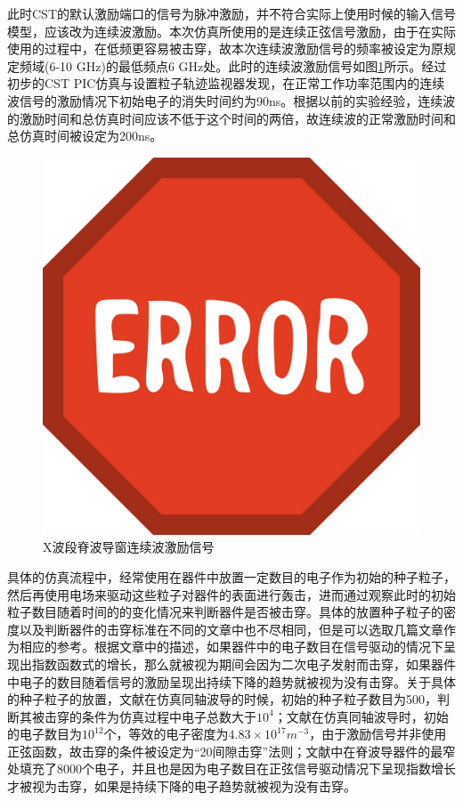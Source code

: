 \documentclass[master]{thesis-uestc}
\begin{document}
此时CST的默认激励端口的信号为脉冲激励，并不符合实际上使用时候的输入信号模型，应该改为连续波激励。本次仿真所使用的是连续正弦信号激励，由于在实际使用的过程中，在低频更容易被击穿，故本次连续波激励信号的频率被设定为原规定频域(6-10 GHz)的最低频点6 GHz处。此时的连续波激励信号如图\ref{fig:X波导窗连续波激励信号}所示。经过初步的CST PIC仿真与设置粒子轨迹监视器发现，在正常工作功率范围内的连续波信号的激励情况下初始电子的消失时间约为90ns。根据以前的实验经验，连续波的激励时间和总仿真时间应该不低于这个时间的两倍，故连续波的正常激励时间和总仿真时间被设定为200ns。
\begin{figure}[!htb]
    \centering
    \includegraphics[width=0.5\linewidth]{pic/ERROR.jpg}
    \caption{X波段脊波导窗连续波激励信号}
    \label{fig:X波导窗连续波激励信号}
\end{figure}

具体的仿真流程中，经常使用在器件中放置一定数目的电子作为初始的种子粒子，然后再使用电场来驱动这些粒子对器件的表面进行轰击，进而通过观察此时的初始粒子数目随着时间的的变化情况来判断器件是否被击穿。具体的放置种子粒子的密度以及判断器件的击穿标准在不同的文章中也不尽相同，但是可以选取几篇文章作为相应的参考。根据文章\cite{li_2021_novel_multipactor}中的描述，如果器件中的电子数目在信号驱动的情况下呈现出指数函数式的增长，那么就被视为期间会因为二次电子发射而击穿，如果器件中电子的数目随着信号的激励呈现出持续下降的趋势就被视为没有击穿。关于具体的种子粒子的放置，文献\cite{gonzalez_2015_experimental}在仿真同轴波导的时候，初始的种子粒子数目为500，判断其被击穿的条件为仿真过程中电子总数大于$10^4$；文献\cite{gonzalez_2016_multipactor}在仿真同轴波导时，初始的电子数目为$10^{12}$个，等效的电子密度为$4.83 \times 10^{17} m^{-3}$，由于激励信号并非使用正弦函数，故击穿的条件被设定为“20间隙击穿”法则；文献\cite{you_2015_highly}中在脊波导器件的最窄处填充了8000个电子，并且也是因为电子数目在正弦信号驱动情况下呈现指数增长才被视为击穿，如果是持续下降的电子趋势就被视为没有击穿。
\end{document}

